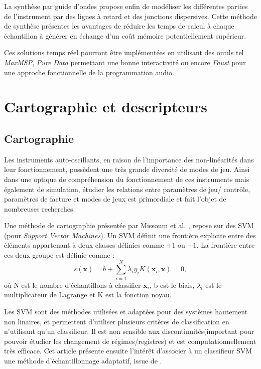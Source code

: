 \documentclass[atiam, article]{rapport} %
\begin{document}
La synthèse par guide d'ondes \cite{smith1987music} propose enfin de modéliser les différentes parties de l'instrument par des lignes à retard et des jonctions dispersives.
Cette méthode de synthèse présentes les avantages de réduire les temps de calcul à chaque échantillon à générer en échange d'un coût mémoire potentiellement supérieur.

Ces solutions temps réel pourront être implémentées en utilisant des outils tel \textit{MaxMSP}, \textit{Pure Data} permettant une bonne interactivité ou encore \textit{Faust} pour une approche fonctionnelle de la programmation audio.

\section{Cartographie et descripteurs}
\subsection{Cartographie}
Les instruments auto-oscillants, en raison de l'importance des non-linéarités dans leur fonctionnement, possèdent une très grande diversité de modes de jeu. Ainsi dans une optique de compréhension du fonctionnement de ces instruments mais également de simulation, étudier les relations entre paramètres de jeu/ contrôle, paramètres de facture et modes de jeux est primordiale et fait l'objet de nombreuses recherches. 

Une méthode de cartographie présentée par Missoum et al. \cite{missoum_explicit_2014}, repose sur des SVM (pour \textit{Support Vector Machines}). 
Un SVM définit une frontière explicite entre des éléments appartenant à deux classes définies comme $+1$ ou $-1$. 
La frontière entre ces deux groupe est définie comme \cite{missoum_explicit_2014} : 
\begin{equation}
    s(\textbf{x}) = b + \sum_{i=1}^{N}\lambda_iy_iK(\textbf{x}_i,\textbf{x}) = 0 ,
\end{equation}
où N est le nombre d'échantillons à classifier $\textbf{x}_i$, b est le biais, $\lambda_i$ est le multiplicateur de Lagrange et K est la fonction noyau. 

Les SVM sont des méthodes utilisées et adaptées pour des systèmes hautement non linaires, et permettent d'utiliser plusieurs critères de classification en n'utilisant qu'un classifieur. Il est non sensible aux discontinuités(important pour pouvoir étudier les changement de régimes/registres) et est computationnellement très efficace. Cet article présente ensuite l'intérêt d'associer à un classifieur SVM une méthode d'échantillonnage  adaptatif, issue de \cite{basudhar2010improved}. 
\end{document}
